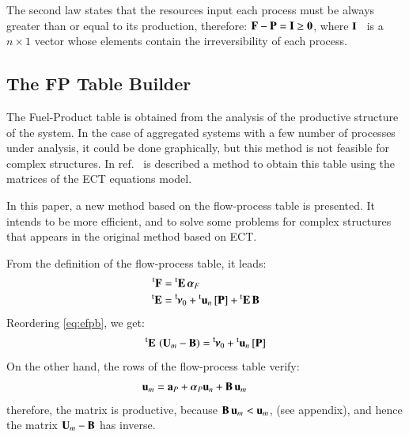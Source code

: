 \documentclass{ecos2018}
\begin{document}
The second law states that the resources input each process must be always greater than or equal to its production, therefore: $\mathbf{F}-\mathbf{P}=\mathbf{I} \ge \mathbf{0}$, where $\mathbf{I}$~ is a $n \times 1$ vector whose elements contain the irreversibility of each process.

\subsection{The FP Table Builder}
The Fuel-Product table is obtained from the analysis of the productive structure of the system. In the case of aggregated systems with a few number of processes under analysis, it could be done graphically, but this method is not feasible for complex structures. In ref.~\cite{TAESS} is described a method to obtain this table using the matrices of the ECT equations model.

In this paper, a new method based on the flow-process table is presented. It intends to be more efficient, and to solve some problems for complex structures that appears in the original method based on ECT.

From the definition of the flow-process table, it leads:
\begin{align}
\prescript{\smash{\mathrm{t}}}{}{\mathbf{F}}&=\prescript{\smash{\mathrm{t}}}{}{\mathbf{E}}\,\bm{\alpha}_F \label{eq:ffpa}\\
\prescript{\smash{\mathrm{t}}}{}{\mathbf{E}}&=\prescript{\smash{\mathsf{t}}}{}{\mskip-1mu}\bm{\nu}_0+\prescript{\smash{\mathrm{t}}}{}{\mathbf{u}}_n\,[\mathbf{P}]+\prescript{\smash{\mathrm{t}}}{}{\mathbf{E}}\,\mathbf{B}\label{eq:efpb}
\end{align}
Reordering \cref{eq:efpb}, we get: 
\begin{equation}
\prescript{\smash{\mathrm{t}}}{}{\mathbf{E}}\,\left(\mathbf{U}_m -\mathbf{B}\right) = \prescript{\smash{\mathsf{t}}}{}{\mskip-1mu}\bm{\nu}_0 +\prescript{\smash{\mathrm{t}}}{}{\mathbf{u}}_n\,[\mathbf{P}]
\label{eq:efpb1}
\end{equation}
On the other hand, the rows of the flow-process table verify:
\begin{equation}
\mathbf{u}_m=\mathbf{a}_P+\bm{\alpha}_P \mathbf{u}_n + \mathbf{B}\,\mathbf{u}_m \qquad   \label{eq:umb}
\end{equation}
therefore, the matrix  is productive, because $\mathbf{B}\,\mathbf{u}_m < \mathbf{u}_m$, (see appendix), and hence the matrix $\mathbf{U}_m - \mathbf{B}$ has inverse. 
\end{document}
